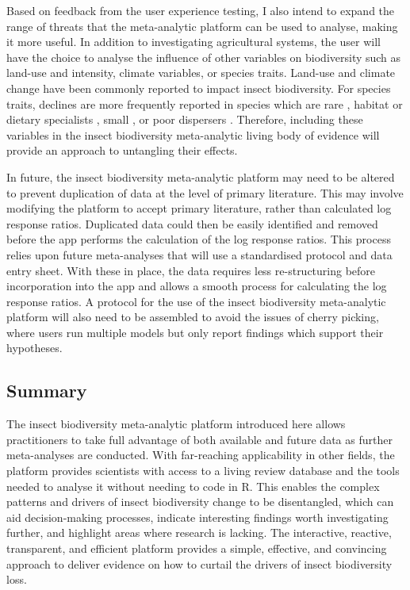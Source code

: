 \documentclass[11pt]{article}
\begin{document}
			\noindent Based on feedback from the user experience testing, I also intend to expand the range of threats that the meta-analytic platform can be used to analyse, making it more useful. In addition to investigating agricultural systems, the user will have the choice to analyse the influence of other variables on biodiversity such as land-use and intensity, climate variables, or species traits. Land-use \parencite{newbold2016global,seibold2019arthropod,gillespie2022landscape} and climate change \parencite{deutsch2008impacts,lister2018climate,engelhardt2022consistent} have been commonly reported to impact insect biodiversity. For species traits, declines are more frequently reported in species which are rare \parencite{powney2019widespread,outhwaite2020complex}, habitat or dietary specialists \parencite{biesmeijer2006parallel,boyes2019bucking,wagner2021window}, small \parencite{homburg2019have}, or poor dispersers \parencite{cardoso2020scientists}. Therefore, including these variables in the insect biodiversity meta-analytic living body of evidence will provide an approach to untangling their effects. 
			
			\noindent In future, the insect biodiversity meta-analytic platform may need to be altered to prevent duplication of data at the level of primary literature. This may involve modifying the platform to accept primary literature, rather than calculated log response ratios. Duplicated data could then be easily identified and removed before the app performs the calculation of the log response ratios. This process relies upon future meta-analyses that will use a standardised protocol and data entry sheet. With these in place, the data requires less re-structuring before incorporation into the app and allows a smooth process for calculating the log response ratios. A protocol for the use of the insect biodiversity meta-analytic platform will also need to be assembled to avoid the issues of cherry picking, where users run multiple models but only report findings which support their hypotheses. 
		
		\subsection{Summary}
			The insect biodiversity meta-analytic platform introduced here allows practitioners to take full advantage of both available and future data as further meta-analyses are conducted. With far-reaching applicability in other fields, the platform provides scientists with access to a living review database and the tools needed to analyse it without needing to code in R. This enables the complex patterns and drivers of insect biodiversity change to be disentangled, which can aid decision-making processes, indicate interesting findings worth investigating further, and highlight areas where research is lacking. The interactive, reactive, transparent, and efficient platform provides a simple, effective, and convincing approach to deliver evidence on how to curtail the drivers of insect biodiversity loss.  
		
\end{document}
